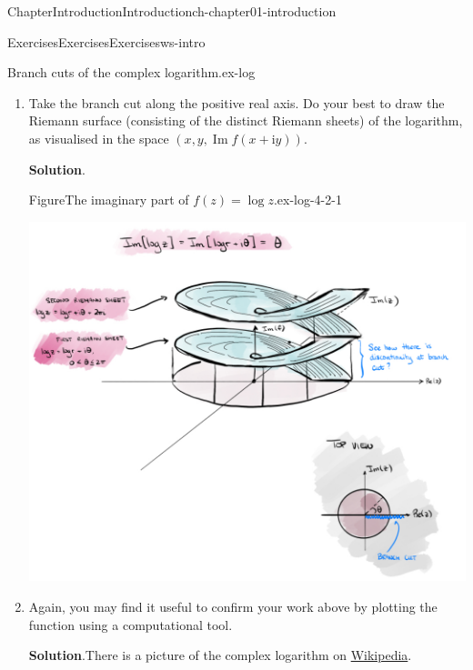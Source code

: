 \documentclass[oneside,10pt,]{book}
\newcommand{\blocktitlefont}{\relax}
\numberwithin{equation}{section}
\renewcommand*{\Im}{\operatorname{Im}}
\newcommand{\im}{\mathrm{i}}
\begin{document}
\begin{chapterptx}{Chapter}{Introduction}{}{Introduction}{}{}{ch-chapter01-introduction}
\begin{exercises-section}{Exercises}{Exercises}{}{Exercises}{}{}{ws-intro}
\begin{divisionexercise}{3}{Branch cuts of the complex logarithm.}{}{ex-log}
\begin{enumerate}[font=\bfseries,label=(\alph*),ref=\alph*]
\noindent\textbf{\blocktitlefont Solution}.\hypertarget{ex-log-3-2}{}\quad{}The logarithm will have a jump in the imaginary part every rotation of \(2\pi\) in the argument.%
\item{}Take the branch cut along the positive real axis. Do your best to draw the Riemann surface (consisting of the distinct Riemann sheets) of the logarithm, as visualised in the space \((x, y, \Im f(x + \im y))\).%
\par\smallskip%
\noindent\textbf{\blocktitlefont Solution}.\hypertarget{ex-log-4-2}{}\quad{}\begin{figureptx}{Figure}{The imaginary part of \(f(z) = \log z\).}{ex-log-4-2-1}{}%
\begin{image}{0}{1}{0}{}%
\includegraphics[width=\linewidth]{external/intro_log_surf.jpg}
\end{image}%
\tcblower
\end{figureptx}%
\item{}Again, you may find it useful to confirm your work above by plotting the function using a computational tool.%
\par\smallskip%
\noindent\textbf{\blocktitlefont Solution}.\hypertarget{ex-log-5-2}{}\quad{}There is a picture of the complex logarithm on \href{https://en.wikipedia.org/wiki/Complex_logarithm}{Wikipedia}.%
\end{enumerate}%
\end{divisionexercise}%
\end{exercises-section}
\end{chapterptx}
\end{document}
